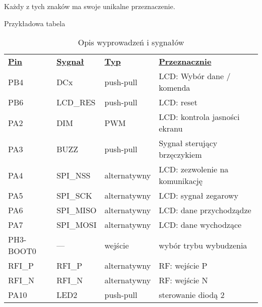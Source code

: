 \noindent Każdy z tych znaków ma swoje unikalne przeznaczenie. 

\noindent Przykładowa tabela
\begin{table}[H] \centering
    \caption{Opis wyprowadzeń i sygnałów}
    \label{tab:base_pins}
    \begin{tabular}{l l l l}
        \toprule[2pt]
        \textbf{\uline{Pin}}     &  \textbf{\uline{Sygnał}}&   \textbf{\uline{Typ}} &  \textbf{\uline{Przeznacznie}}             \\
        PB4                      & DCx                     & push-pull              & LCD: Wybór dane / komenda                  \\  
        PB6                      & LCD\_RES                & push-pull              & LCD: reset                                 \\ 
        PA2                      & DIM                     & PWM                    & LCD: kontrola jasności ekranu              \\ 
        PA3                      & BUZZ                    & push-pull              & Sygnał sterujący brzęczykiem               \\ 
        PA4                      & SPI\_NSS                & alternatywny           & LCD: zezwolenie na komunikację             \\ 
        PA5                      & SPI\_SCK                & alternatywny           & LCD: sygnał zegarowy                       \\ 
        PA6                      & SPI\_MISO               & alternatywny           & LCD: dane przychodządze                    \\ 
        PA7                      & SPI\_MOSI               & alternatywny           & LCD: dane wychodzące                       \\ 
        PH3-BOOT0                & ---                     & wejście                & wybór trybu wybudzenia                     \\ 
        RFI\_P                   & RFI\_P                  & alternatywny           & RF: wejście P                              \\ 
        RFI\_N                   & RFI\_N                  & alternatywny           & RF: wejście N                              \\ 
        PA10                     & LED2                    & push-pull              & sterowanie diodą 2                         \\ 

\end{tabular}
\end{table}
